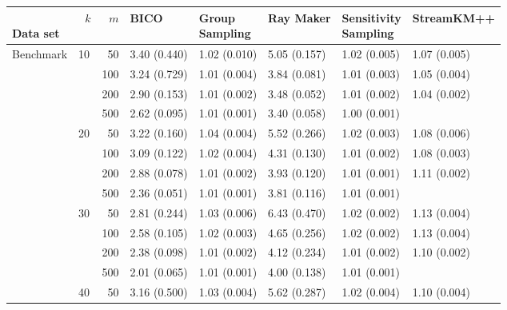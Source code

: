 \begin{longtable}{p{}lrlllll} 
\toprule 
\parbox[t]{2cm}{\ \\Data set}  & \parbox[t]{5mm}{\ \\$k$} & \parbox[t]{5mm}{\ \\$m$} &           BICO & \parbox[t]{1cm}{Group\\Sampling} &      Ray Maker & \parbox[t]{1cm}{Sensitivity\\Sampling} &    StreamKM++ \\
\midrule
Benchmark & 10  & 50  &   3.40 (0.440) &   1.02 (0.010) &   5.05 (0.157) &         1.02 (0.005) &  1.07 (0.005) \\
      &     & 100 &   3.24 (0.729) &   1.01 (0.004) &   3.84 (0.081) &         1.01 (0.003) &  1.05 (0.004) \\
      &     & 200 &   2.90 (0.153) &   1.01 (0.002) &   3.48 (0.052) &         1.01 (0.002) &  1.04 (0.002) \\
      &     & 500 &   2.62 (0.095) &   1.01 (0.001) &   3.40 (0.058) &         1.00 (0.001) &            \\
      & 20  & 50  &   3.22 (0.160) &   1.04 (0.004) &   5.52 (0.266) &         1.02 (0.003) &  1.08 (0.006) \\
      &     & 100 &   3.09 (0.122) &   1.02 (0.004) &   4.31 (0.130) &         1.01 (0.002) &  1.08 (0.003) \\
      &     & 200 &   2.88 (0.078) &   1.01 (0.002) &   3.93 (0.120) &         1.01 (0.001) &  1.11 (0.002) \\
      &     & 500 &   2.36 (0.051) &   1.01 (0.001) &   3.81 (0.116) &         1.01 (0.001) &            \\
      & 30  & 50  &   2.81 (0.244) &   1.03 (0.006) &   6.43 (0.470) &         1.02 (0.002) &  1.13 (0.004) \\
      &     & 100 &   2.58 (0.105) &   1.02 (0.003) &   4.65 (0.256) &         1.02 (0.002) &  1.13 (0.004) \\
      &     & 200 &   2.38 (0.098) &   1.01 (0.002) &   4.12 (0.234) &         1.01 (0.002) &  1.10 (0.002) \\
      &     & 500 &   2.01 (0.065) &   1.01 (0.001) &   4.00 (0.138) &         1.01 (0.001) &            \\
      & 40  & 50  &   3.16 (0.500) &   1.03 (0.004) &   5.62 (0.287) &         1.02 (0.004) &  1.10 (0.004) \\

\end{longtable}
